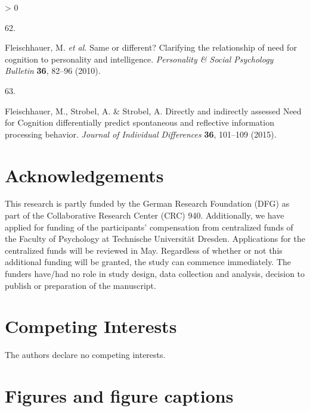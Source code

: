 \documentclass[
  english,
  man,floatsintext]{apa6}
\newlength{\cslhangindent}
\newlength{\csllabelwidth}
\newenvironment{CSLReferences}[2] %
 {%
  \setlength{\parindent}{0pt}
  \ifodd #1 \everypar{\setlength{\hangindent}{\cslhangindent}}\ignorespaces\fi
  \ifnum #2 > 0
  \setlength{\parskip}{#2\baselineskip}
  \fi
 }%
 {}
\newcommand{\CSLLeftMargin}[1]{\parbox[t]{\csllabelwidth}{#1}}
\newcommand{\CSLRightInline}[1]{\parbox[t]{\linewidth - \csllabelwidth}{#1}\break}
\begin{document}
\begin{CSLReferences}{0}{0}
\leavevmode\hypertarget{ref-Fleischhauer2010}{}%
\CSLLeftMargin{62. }
\CSLRightInline{Fleischhauer, M. \emph{et al.} Same or different? {Clarifying} the relationship of need for cognition to personality and intelligence. \emph{Personality \& Social Psychology Bulletin} \textbf{36}, 82--96 (2010).}

\leavevmode\hypertarget{ref-Fleischhauer2015}{}%
\CSLLeftMargin{63. }
\CSLRightInline{Fleischhauer, M., Strobel, A. \& Strobel, A. Directly and indirectly assessed {N}eed for {C}ognition differentially predict spontaneous and reflective information processing behavior. \emph{Journal of Individual Differences} \textbf{36}, 101--109 (2015).}

\end{CSLReferences}

\endgroup

\newpage

\hypertarget{acknowledgements}{%
\section{Acknowledgements}\label{acknowledgements}}

This research is partly funded by the German Research Foundation (DFG) as part of the Collaborative Research Center (CRC) 940.
Additionally, we have applied for funding of the participants' compensation from centralized funds of the Faculty of Psychology at Technische Universität Dresden.
Applications for the centralized funds will be reviewed in May.
Regardless of whether or not this additional funding will be granted, the study can commence immediately.
The funders have/had no role in study design, data collection and analysis, decision to publish or preparation of the manuscript.

\hypertarget{competing-interests}{%
\section{Competing Interests}\label{competing-interests}}

The authors declare no competing interests.

\newpage
\setcounter{figure}{0}

\hypertarget{figures-and-figure-captions}{%
\section{Figures and figure captions}\label{figures-and-figure-captions}}
\end{document}
